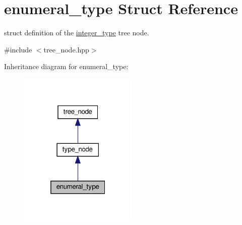 \hypertarget{structenumeral__type}{}\section{enumeral\+\_\+type Struct Reference}
\label{structenumeral__type}


struct definition of the \hyperlink{structinteger__type}{integer\+\_\+type} tree node.  




{\ttfamily \#include $<$tree\+\_\+node.\+hpp$>$}



Inheritance diagram for enumeral\+\_\+type\+:
\nopagebreak
\begin{figure}[H]
\begin{center}
\leavevmode
\includegraphics[width=160pt]{db/d61/structenumeral__type__inherit__graph}
\end{center}
\end{figure}



